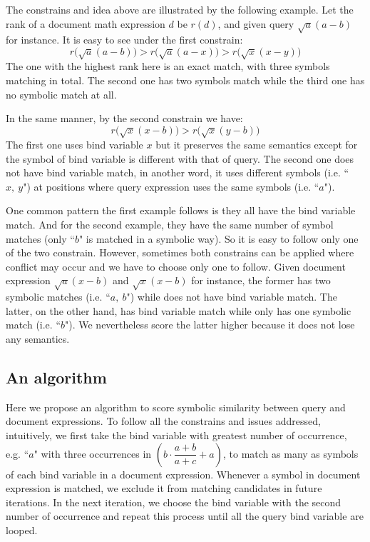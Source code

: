 The constrains and idea above are illustrated by the following example. 
Let the rank of a document math expression $d$ be $r(d)$, and given query $\sqrt a (a - b)$ for instance. 
It is easy to see under the first constrain: 
$$
r\big(\sqrt a (a - b)\big) > r\big(\sqrt a (a - x)\big) > r\big(\sqrt x (x - y)\big)
$$
The one with the highest rank here is an exact match, with three symbols matching in total. 
The second one has two symbols match while the third one has no symbolic match at all. 

In the same manner, by the second constrain we have:
$$
r\big(\sqrt x (x - b)\big) > r\big(\sqrt x (y - b)\big)
$$
The first one uses bind variable $x$ but it preserves the same semantics except for the symbol of bind variable is different with that of query.
The second one does not have bind variable match, in another word, it uses different symbols (i.e. ``$x,\ y$") at positions where query expression uses the same symbols (i.e. ``$a$").

One common pattern the first example follows is they all have the bind variable match. 
And for the second example, they have the same number of symbol matches (only ``$b$" is matched in a symbolic way). 
So it is easy to follow only one of the two constrain. 
However, sometimes both constrains can be applied where conflict may occur and we have to choose only one to follow. 
Given document expression $\sqrt a (x - b)$ and $\sqrt x (x - b)$ for instance, the former has two symbolic matches (i.e. ``$a,\ b$") while does not have bind variable match. The latter, on the other hand, has bind variable match while only has one symbolic match (i.e. ``$b$"). We nevertheless score the latter higher because it does not lose any semantics. 

\subsection{An algorithm}
Here we propose an algorithm to score symbolic similarity between query and document expressions.
To follow all the constrains and issues addressed, intuitively, we first take the bind variable with greatest number of occurrence, e.g. ``$a$" with three occurrences in $\left(b \cdot \dfrac{a+b}{a+c} + a\right)$, to match as many as symbols of each bind variable in a document expression. 
Whenever a symbol in document expression is matched, we exclude it from matching candidates in future iterations.
In the next iteration, we choose the bind variable with the second number of occurrence and repeat this process until all the query bind variable are looped.

